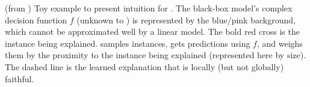 (from \cite{Ribeiro0G16}) 
Toy example to present intuition for \lime{}.
The black-box model’s complex decision function $f$ (unknown to \lime{}) is represented by the blue/pink background, which cannot be approximated well by a linear model.
The bold red cross is the instance being explained.
\lime{} samples instances, gets predictions using $f$, and weighs them by the proximity to the instance being explained (represented here by size).
The dashed line is the learned explanation that is locally (but not globally) faithful.
